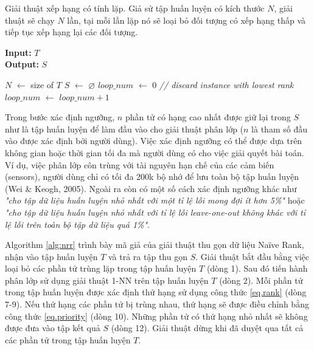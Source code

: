 \documentclass[13pt,oneside]{scrbook}
\newcommand*\Let[2]{\State #1 $\gets$ #2}
\let\emptyset\varnothing
\begin{document}
Giải thuật xếp hạng có tính lặp. 
Giả sử tập huấn luyện có kích thước $N$, giải thuật sẽ chạy $N$ lần, tại mỗi lần lặp nó sẽ loại bỏ đối tượng có xếp hạng thấp và tiếp tục xếp hạng lại các đối tượng.

\begin{algorithm}[h!]
  \caption{Na{\"\i}ve Rank Reduction
   \label{alg:nrr}}
    \textbf{Input:} $T$\\
    \textbf{Output:} $S$
  \begin{algorithmic}[1]
      \Let{$N$}{size of $T$}
      \Let{$S$}{$\emptyset$}
      \Let{$loop\_num$}{0}
          \EndFor
           \textit{// discard instance with lowest rank}
          \Let{$loop\_num$}{$loop\_num + 1$}
      \EndWhile
      \State {}
  \end{algorithmic}
\end{algorithm}

Trong bước xác định ngưỡng, $n$ phần tử có hạng cao nhất được giữ lại trong  $S$ như là tập huấn luyện để làm đầu vào cho giải thuật phân lớp ($n$ là tham số đầu vào được xác định bởi người dùng).
Việc xác định ngưỡng có thể được dựa trên không gian hoặc thời gian tối đa mà người dùng có cho việc giải quyết bài toán.
Ví dụ, việc phân lớp côn trùng với tài nguyên hạn chế của các cảm biến (sensors), người dùng chỉ có tối đa 200k bộ nhớ để lưu toàn bộ tập huấn luyện (Wei \& Keogh, 2005).
Ngoài ra còn có một số cách xác định ngưỡng khác như \textit{"cho tập dữ liệu huấn luyện nhỏ nhất với một tỉ lệ lỗi mong đợi ít hơn 5\%"} hoặc \textit{"cho tập dữ liệu huấn luyện nhỏ nhất với tỉ lệ lỗi leave-one-out không khác với tỉ lệ lỗi trên toàn bộ tập dữ liệu quá 1\%"}.

Algorithm \ref{alg:nrr} trình bày mã giả của giải thuật thu gọn dữ liệu Naïve Rank, nhận vào tập huấn luyện $T$ và trả ra tập thu gọn $S$.
Giải thuật bắt đầu bằng việc loại bỏ các phần tử trùng lặp trong tập huấn luyện $T$ (dòng 1).
Sau đó tiến hành phân lớp sử dụng giải thuật 1-NN trên tập huấn luyện $T$ (dòng 2).
Mỗi phần tử trong tập huấn luyện được xác định thứ hạng sử dụng công thức \ref{eq.rank} (dòng 7-9).
Nếu thứ hạng các phần tử bị trùng nhau, thứ hạng sẽ được điều chỉnh bằng công thức \ref{eq.priority} (dòng 10).
Những phần tử có thứ hạng nhỏ nhất sẽ không được đưa vào tập kết quả $S$ (dòng 12).
Giải thuật dừng khi đã duyệt qua tất cả các phần tử trong tập huấn luyện $T$.
\end{document}
